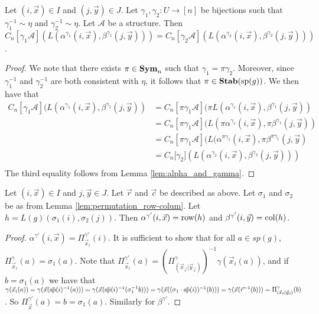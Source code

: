\documentclass[../paper.tex]{subfiles}
\begin{document}
\begin{lem}
  \label{lem:alpha_ind_gamma}
  Let $(i,\vec{x}) \in I$ and $(j, \vec{y}) \in J$. Let $\gamma_1, \gamma_2: U
  \rightarrow [n]$ be bijections such that $\gamma^{-1}_1 \sim \eta$ and
  $\gamma^{-1}_2 \sim \eta$. Let $\mathcal{A}$ be a structure. Then
  $C_n[\gamma_1 \mathcal{A}] (L(\alpha^{\gamma_1}(i, \vec{x}),
  \beta^{\gamma_1}(j, \vec{y}))) = C_n[\gamma_2 \mathcal{A}]
  (L(\alpha^{\gamma_2}(i, \vec{x}), \beta^{\gamma_2}(j, \vec{y})))$.
\end{lem}
\begin{proof}
  We note that there exists $\pi \in \text{\textbf{Sym}}_n$ such that $\gamma_1 = \pi
  \gamma_2$. Moreover, since $\gamma^{-1}_1$ and $\gamma^{-1}_2$ are both
  consistent with $\eta$, it follows that $\pi \in \text{\textbf{Stab}} (\text{sp} (g))$. We then have
  that
  \begin{align*}
    C_n[\gamma_1 \mathcal{A}](L(\alpha^{\gamma_1}(i, \vec{x}), \beta^{\gamma_1}(j,
    \vec{y})) &= C_n[\pi \gamma_1 \mathcal{A}](\pi L(\alpha^{\gamma_1}(i, \vec{x}),
                \beta^{\gamma_1}(j, \vec{y})) \\
              &= C_n[\pi \gamma_1 \mathcal{A}](L(\pi
                \alpha^{\gamma_1}(i, \vec{x}), \pi \beta^{\gamma_1}(j, \vec{y}))\\
              &= C_n[\pi
                \gamma_1 \mathcal{A}](L(\alpha^{\pi \gamma_1}(i, \vec{x}), \pi \beta^{\pi
                \gamma_1}(j, \vec{y})\\
              &= C_n[\gamma_2 \mathcal] (L(\alpha^{\gamma_2}(i,
                \vec{x}), \beta^{\gamma_2}(j, \vec{y})))\\
  \end{align*}The third equality follows from Lemma \ref{lem:alpha_and_gamma}.
\end{proof}

\begin{lem}
  \label{lem:defining_h_from_IJ}
  Let $(i, \vec{x}) \in I$ and $j, \vec{y} \in J$. Let $\vec{r}$ and $\vec{c}$
  be described as above. Let $\sigma_1$ and $\sigma_2$ be as from Lemma
  \ref{lem:permutation_row-colum}. Let $h = L(g) (\sigma_1 (i), \sigma_2 (j))$.
  Then $\alpha^{\gamma'} (i, \vec{x}) = \text{row} (h)$ and $\beta^{\gamma'}
  (i,\vec{y}) = \text{col}(h)$.
\end{lem}
\begin{proof}
  $\alpha^{\gamma'}(i, \vec{x}) = \Pi^{\gamma'}_{\vec{x}_i} (i)$. It is
  sufficient to show that for all $a \in sp(g)$, $\Pi^{\gamma}_{\vec{x}_i} (a) =
  \sigma_1 (a)$. Note that $\Pi^{\gamma'}_{\vec{x}_i} (a) =
  (\Pi^{\gamma}_{(\vec{x}_{\vec{r}} \vert \vec{y}_{\vec{c}})})^{-1} \gamma
  (\vec{x}_i (a))$, and if $b = \sigma_1 (a)$ we have that $\gamma (\vec{x}_i
  (a)) = \gamma (\vec{x} (\vec{\text{sp}}(i)^{-1} (a))) = \gamma (\vec{x}
  (\vec{\text{sp}}(i)^{-1} (\sigma^{-1}_1 b))) = \gamma (\vec{x} ((\sigma_1 \cdot
  \vec{\text{sp}}(i))^{-1} (b))) = \gamma (\vec{x} (\vec{r}^{-1}(b))) =
  \Pi^{\gamma}_{(\vec{x}_{\vec{r}} \vert \vec{y}_{\vec{c}})}(b)$. So
  $\Pi^{\gamma'}_{\vec{x}} (a) = b = \sigma_1 (a)$. Similarly for
  $\beta^{\gamma'}$.
\end{proof}
\end{document}
